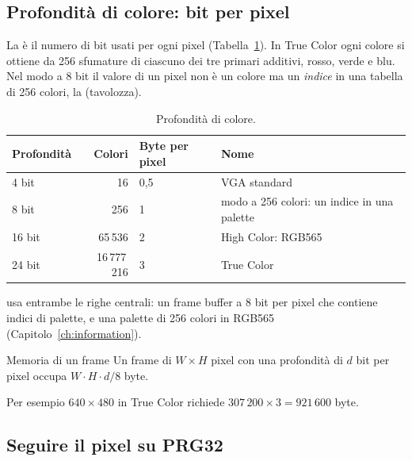 \subsection{Profondità di colore: bit per pixel}

La  è il numero di bit usati per ogni pixel
(Tabella~\ref{tab:vid:depth}). In True Color ogni colore si ottiene da 256
sfumature di ciascuno dei tre primari additivi, rosso, verde e blu. Nel modo a
8 bit il valore di un pixel non è un colore ma un \emph{indice} in una tabella
di 256 colori, la  (tavolozza).

\begin{table}[htb]
\centering\small
\caption{Profondità di colore.}\label{tab:vid:depth}
\begin{tabular}{@{}lrll@{}}
\toprule
\textbf{Profondità} & \textbf{Colori} & \textbf{Byte per pixel} & \textbf{Nome}\\
\midrule
4 bit & 16 & 0,5 & VGA standard\\
8 bit & 256 & 1 & modo a 256 colori: un indice in una palette\\
16 bit & 65\,536 & 2 & High Color: RGB565\\
24 bit & 16\,777\,216 & 3 & True Color\\
\bottomrule
\end{tabular}
\end{table}

\prg usa entrambe le righe centrali: un frame buffer a 8 bit per pixel che
contiene indici di palette, e una palette di 256 colori in RGB565
(Capitolo~\ref{ch:information}).

\begin{theorem}{Memoria di un frame}
Un frame di $W\times H$ pixel con una profondità di $d$ bit per pixel occupa
$W\cdot H\cdot d/8$ byte.
\end{theorem}

Per esempio $640\times 480$ in True Color richiede
$307\,200\times 3 = 921\,600$ byte.

\subsection{Seguire il pixel su PRG32}

